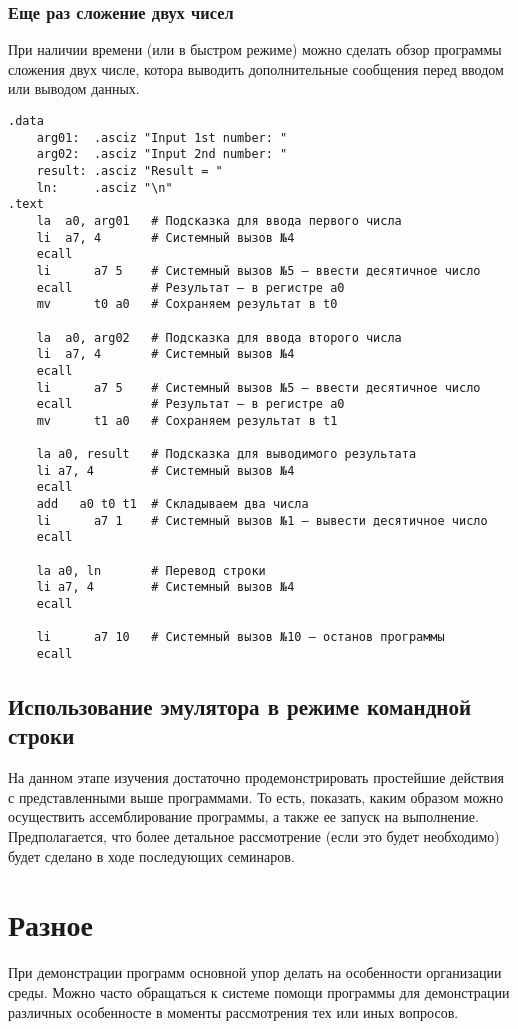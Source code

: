 \subsubsection{Еще раз сложение двух чисел}
При наличии времени (или в быстром режиме) можно сделать обзор программы сложения двух числе, котора выводить дополнительные сообщения перед вводом или выводом данных.
\begin{verbatim}
.data
    arg01:  .asciz "Input 1st number: "
    arg02:  .asciz "Input 2nd number: "
    result: .asciz "Result = "
    ln:     .asciz "\n"
.text
    la 	a0, arg01   # Подсказка для ввода первого числа
    li 	a7, 4       # Системный вызов №4
    ecall
    li      a7 5    # Системный вызов №5 — ввести десятичное число
    ecall           # Результат — в регистре a0
    mv      t0 a0   # Сохраняем результат в t0

    la 	a0, arg02   # Подсказка для ввода второго числа
    li 	a7, 4       # Системный вызов №4
    ecall
    li      a7 5    # Системный вызов №5 — ввести десятичное число
    ecall           # Результат — в регистре a0
    mv      t1 a0   # Сохраняем результат в t1

    la a0, result   # Подсказка для выводимого результата
    li a7, 4        # Системный вызов №4
    ecall
    add   a0 t0 t1  # Складываем два числа
    li      a7 1    # Системный вызов №1 — вывести десятичное число
    ecall

    la a0, ln       # Перевод строки
    li a7, 4        # Системный вызов №4
    ecall

    li      a7 10   # Системный вызов №10 — останов программы
    ecall
\end{verbatim}

\subsection{Использование эмулятора в режиме командной строки}

На данном этапе изучения достаточно продемонстрировать простейшие действия с представленными выше программами. То есть, показать, каким образом можно осуществить ассемблирование программы, а также ее запуск на выполнение. Предполагается, что более детальное рассмотрение (если это будет необходимо) будет сделано в ходе последующих семинаров.

\section{Разное}
При демонстрации программ основной упор делать на особенности организации среды. Можно часто обращаться к системе помощи программы для демонстрации различных особенносте в моменты рассмотрения тех или иных вопросов.

